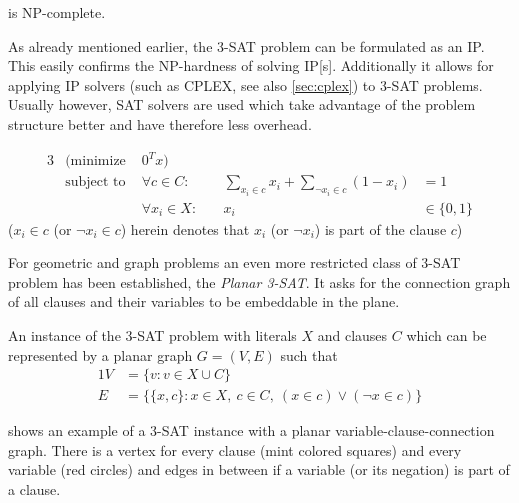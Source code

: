 \begin{theorem}
   is NP-complete.~\cite[Satisfiability with at most %
  3 Literals per Clause]{karp_np_complete}
\end{theorem}

As already mentioned earlier, the 3-SAT problem can be formulated as
an \gls{IP}. This easily confirms the NP-hardness of solving
\gls{IP}[s]. Additionally it allows for applying \gls{IP} solvers 
(such as CPLEX, see also \cref{sec:cplex}) to 3-SAT problems. Usually
however, SAT solvers are used which take advantage of the problem
structure better and have therefore less overhead.

\begin{problem}
  \begin{alignat*}{3}
    &(\text{minimize } & 0^Tx) \\
    &\text{subject to } & \forall c \in C : &~
    & \sum\limits_{x_i \in c} x_i + \sum\limits_{\lnot x_i \in c} (1 - x_i) &= 1 \\
    && \forall x_i \in X : &~& x_i &\in \{0,1\}
  \end{alignat*}
  (\(x_i \in c\) (or \(\lnot x_i \in c\)) herein denotes that
  \(x_i\) (or \(\lnot x_i\)) is part of the clause \(c\))
\end{problem}

For geometric and graph problems an even more restricted class of
3-SAT problem has been established, the \emph{Planar 3-SAT}. It asks
for the connection graph of all clauses and their variables to be
embeddable in the plane.

\begin{problem}
  \label{prob:planar_3SAT}
  An instance of the 3-SAT problem with literals \(X\) and
  clauses \(C\) which can be represented by a planar graph
  \(G = (V,E)\) such that
  \begin{alignat*}{1}
    V &= \{v : v \in X \cup C\} \\
    E &= \{ \{x, c\} :
      x \in X,~
      c \in C,~
      (x \in c) \lor (\lnot x \in c)
    \}
  \end{alignat*}
\end{problem}

 shows an example of a 3-SAT instance
with a planar variable-clause-connection graph. There is a vertex for
every clause (mint colored squares) and every variable (red circles)
and edges in between if a variable (or its negation) is part of a
clause.

